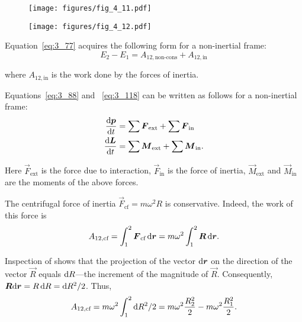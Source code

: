\begin{figure}[t]
	\begin{minipage}[t]{0.5\linewidth}
		\begin{center}
			\texttt{[image: figures/fig\_4\_11.pdf]}
			\caption[]{}
			\label{fig:4_11}
		\end{center}
	\end{minipage}
	\hspace{-0.05cm}
	\begin{minipage}[t]{0.5\linewidth}
		\begin{center}
			\texttt{[image: figures/fig\_4\_12.pdf]}
			\caption[]{}
			\label{fig:4_12}
		\end{center}
	\end{minipage}
\end{figure}

Equation~\eqref{eq:3_77} acquires the following form for a non-inertial frame:
\begin{equation}\label{eq:4_26}
E_2-E_1 = A_{12,\text{non-cons}} + A_{12,\text{in}}
\end{equation}

\noindent
where $A_{12,\text{in}}$ is the work done by the forces of inertia.

Equations~\eqref{eq:3_88} and ~\eqref{eq:3_118} can be written as follows for a non-inertial frame:
\begin{align}
\frac{\mathrm{d}\boldsymbol{p}}{\mathrm{d} t} &= \sum\boldsymbol{F}_{\text{ext}} + \sum\boldsymbol{F}_{\text{in}}\label{eq:4_27}\\
\frac{\mathrm{d}\boldsymbol{L}}{\mathrm{d} t} &= \sum\boldsymbol{M}_{\text{ext}} + \sum\boldsymbol{M}_{\text{in}}\label{eq:4_28}.
\end{align}

Here $\vec{F}_{\text{ext}}$ is the force due to interaction, $\vec{F}_{\text{in}}$ is the force of inertia, $\vec{M}_{\text{ext}}$ and $\vec{M}_{\text{in}}$ are the moments of the above forces.

The centrifugal force of inertia $\vec{F}_{\text{cf}}=m\omega^2 R$ is conservative. Indeed, the work of this force is
\begin{equation*}
A_{12,\text{cf}} = \int_1^2\boldsymbol{F}_{\text{cf}}\,\mathrm{d}\boldsymbol{r} = m\omega^2\int_{1}^{2}\boldsymbol{R}\,\mathrm{d}\boldsymbol{r}.
\end{equation*}

\noindent
Inspection of  shows that the projection of the vector $\mathrm{d}\boldsymbol{r}$ on the direction of the vector $\vec{R}$ equals $\mathrm{d} R$---the increment of the magnitude of $\vec{R}$. Consequently, $\boldsymbol{R}\mathrm{d}\boldsymbol{r}=R\,\mathrm{d} R = \mathrm{d} R^2/2$. Thus,
\begin{equation}\label{eq:4_29}
A_{12,\text{cf}} = m\omega^2 \int_{1}^{2} \mathrm{d} R^2/2 = m\omega^2 \frac{R^2_2}{2} - m\omega^2 \frac{R^2_1}{2}.
\end{equation}

